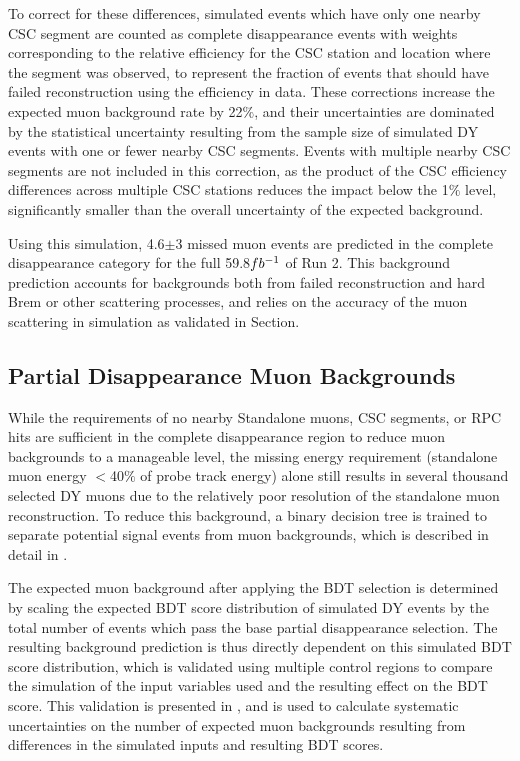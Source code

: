 To correct for these differences, simulated events which have only one nearby CSC segment are counted as complete disappearance events with weights corresponding to the relative efficiency for the CSC station and location where the segment was observed, to represent the fraction of events that should have failed reconstruction using the efficiency in data.
These corrections increase the expected muon background rate by 22$\%$, and their uncertainties are dominated by the statistical uncertainty resulting from the sample size of simulated DY events with one or fewer nearby CSC segments.
Events with multiple nearby CSC segments are not included in this correction, as the product of the CSC efficiency differences across multiple CSC stations reduces the impact below the 1$\%$ level, significantly smaller than the overall uncertainty of the expected background.

Using this simulation, 4.6$\pm$3 missed muon events are predicted in the complete disappearance category for the full 59.8$fb^{-1}$ of Run 2. 
This background prediction accounts for backgrounds both from failed reconstruction and hard Brem or other scattering processes, and relies on the accuracy of the muon scattering in simulation as validated in Section.

\subsection{Partial Disappearance Muon Backgrounds}
While the requirements of no nearby Standalone muons, CSC segments, or RPC hits are sufficient in the complete disappearance region to reduce muon backgrounds to a manageable level, the missing energy requirement (standalone muon energy $<$40$\%$ of probe track energy) alone still results in several thousand selected DY muons due to the relatively poor resolution of the standalone muon reconstruction.
To reduce this background, a binary decision tree is trained to separate potential signal events from muon backgrounds, which is described in detail in .

The expected muon background after applying the BDT selection is determined by scaling the expected BDT score distribution of simulated DY events by the total number of events which pass the base partial disappearance selection.
The resulting background prediction is thus directly dependent on this simulated BDT score distribution, which is validated using multiple control regions to compare the simulation of the input variables used and the resulting effect on the BDT score.
This validation is presented in , and is used to calculate systematic uncertainties on the number of expected muon backgrounds resulting from differences in the simulated inputs and resulting BDT scores.

